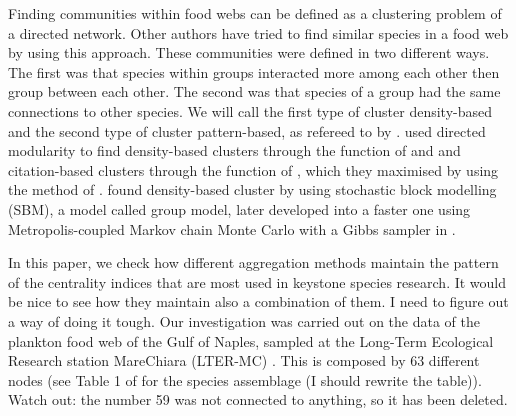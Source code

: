     \par Finding communities within food webs can be defined as a clustering problem of a directed network. Other authors have tried to find similar species in a food web by using this approach. These communities were defined in two different ways. The first was that species within groups interacted more among each other then group between each other. The second was that species of a group had the same connections to other species. We will call the first type of cluster density-based and the second type of cluster pattern-based, as refereed to by \citet{Malliaros2013}.  \citet{Guimera2010} used directed modularity to find density-based clusters through the function of \citet{Arenas2007} and \citet{Leicht2008} and citation-based clusters through the function of \citet{Guimera2007}, which they maximised by using the method of \citet{Newman2004}. \citet{Allesina2009a} found density-based cluster by using stochastic block modelling (SBM), a model called group model, later developed into a faster one using Metropolis-coupled Markov chain Monte Carlo with a Gibbs sampler in \citet{Sander2015}.
    \par In this paper, we check how different aggregation methods maintain the pattern of the centrality indices that are most used in keystone species research. {\color{red}It would be nice to see how they maintain also a combination of them. I need to figure out a way of doing it tough.} Our investigation was carried out on the data of the plankton food web of the Gulf of Naples, sampled at the Long-Term Ecological Research station MareChiara (LTER-MC) \citep{RiberadAlcala2004}. This is composed by 63 different nodes (see Table 1 of \citep{DAlelio2016} for the species assemblage {\color{red} (I should rewrite the table)}). Watch out: the number 59 was not connected to anything, so it has been deleted.
